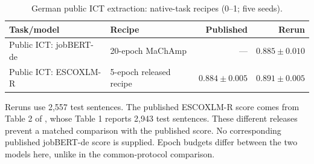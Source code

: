 \begin{table}[H]
\centering\small
\caption{German public ICT extraction: native-task recipes (0--1; five seeds).}
\label{tab:external-gnehm}
\begin{tabularx}{\linewidth}{@{}L P{.25\linewidth}rr@{}}
\toprule
Task/model & Recipe & Published & Rerun \\
\midrule
Public ICT: jobBERT-de & 20-epoch MaChAmp & --- & $0.885\pm0.010$ \\
Public ICT: ESCOXLM-R & 5-epoch released recipe & $0.884\pm0.005$ & $0.891\pm0.005$ \\
\bottomrule
\end{tabularx}
\par\smallskip\RaggedRight\footnotesize Reruns use 2,557 test sentences. The published ESCOXLM-R score comes from Table 2 of \citet{zhang2023escoxlmr}, whose Table 1 reports 2,943 test sentences. These different releases prevent a matched comparison with the published score. No corresponding published jobBERT-de score is supplied. Epoch budgets differ between the two models here, unlike in the common-protocol comparison.
\end{table}

